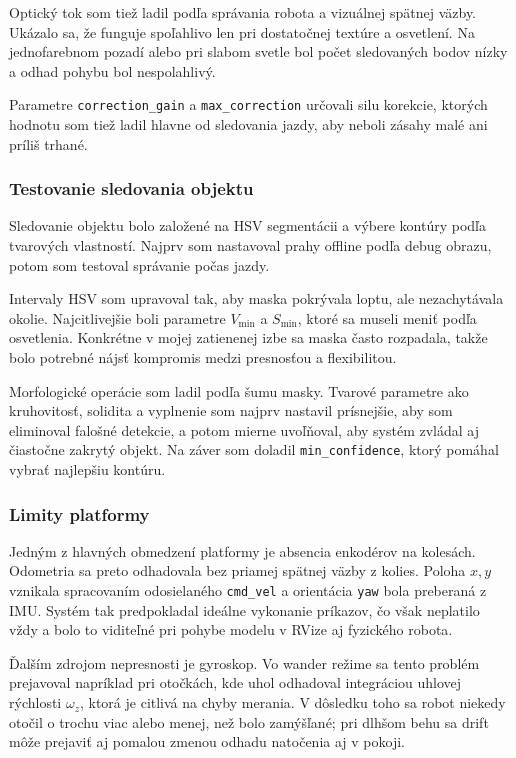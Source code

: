         Optický tok som tiež ladil podľa správania robota a vizuálnej spätnej väzby. Ukázalo sa, že funguje spoľahlivo len pri dostatočnej textúre a osvetlení. Na jednofarebnom pozadí alebo pri slabom svetle bol počet sledovaných bodov nízky a odhad pohybu bol nespolahlivý.
      
        Parametre \texttt{correction\_gain} a \texttt{max\_correction} určovali silu korekcie, ktorých hodnotu som tiež ladil hlavne od sledovania jazdy, aby neboli zásahy malé ani príliš trhané.
      
        \subsubsection{Testovanie sledovania objektu}
      
        Sledovanie objektu bolo založené na HSV segmentácii a výbere kontúry podľa tvarových vlastností. Najprv som nastavoval prahy offline podľa debug obrazu, potom som testoval správanie počas jazdy.
      
        Intervaly HSV som upravoval tak, aby maska pokrývala loptu, ale nezachytávala okolie. Najcitlivejšie boli parametre $V_{\min}$ a $S_{\min}$, ktoré sa museli meniť podľa osvetlenia. Konkrétne v mojej zatienenej izbe sa maska často rozpadala, takže bolo potrebné nájsť kompromis medzi presnosťou a flexibilitou.
      
        Morfologické operácie som ladil podľa šumu masky. Tvarové parametre ako kruhovitosť, solidita a vyplnenie som najprv nastavil prísnejšie, aby som eliminoval falošné detekcie, a potom mierne uvoľňoval, aby systém zvládal aj čiastočne zakrytý objekt. Na záver som doladil \texttt{min\_confidence}, ktorý pomáhal vybrať najlepšiu kontúru.
      
        \subsubsection{Limity platformy}
      
        Jedným z hlavných obmedzení platformy je absencia enkodérov na kolesách. Odometria sa preto odhadovala bez priamej spätnej väzby z kolies. Poloha $x,y$ vznikala spracovaním odosielaného \texttt{cmd\_vel} a orientácia \texttt{yaw} bola preberaná z IMU. Systém tak predpokladal ideálne vykonanie príkazov, čo však neplatilo vždy a bolo to viditeľné pri pohybe modelu v RVize aj fyzického robota.
      
        Ďalším zdrojom nepresnosti je gyroskop. Vo wander režime sa tento problém prejavoval napríklad pri otočkách, kde uhol odhadoval integráciou uhlovej rýchlosti $\omega_z$, ktorá je citlivá na chyby merania. V dôsledku toho sa robot niekedy otočil o trochu viac alebo menej, než bolo zamýšľané; pri dlhšom behu sa drift môže prejaviť aj pomalou zmenou odhadu natočenia aj v pokoji.
      
